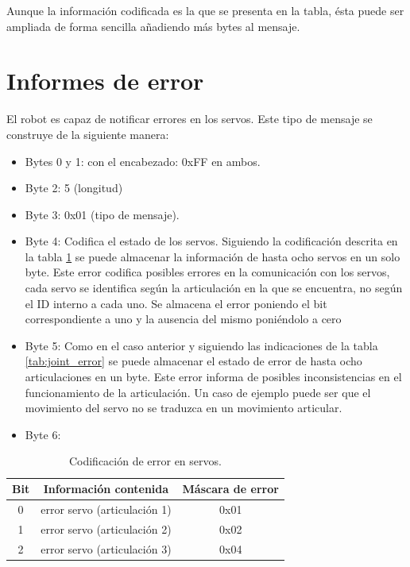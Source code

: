Aunque la información codificada es la que se presenta en la tabla, ésta puede ser ampliada de forma sencilla añadiendo más bytes al mensaje.


\section{Informes de error}


El robot es capaz de notificar errores en los servos. Este tipo de mensaje se construye de la siguiente manera:

\begin{itemize}

\item Bytes 0 y 1: con el encabezado: 0xFF en ambos.

\item Byte 2: 5 (longitud)

\item Byte 3: 0x01 (tipo de mensaje).

\item Byte 4: Codifica el estado de los servos. Siguiendo la codificación descrita en la tabla \ref{tab:servo_error} se puede almacenar la información de hasta ocho servos en un solo byte. Este error codifica posibles errores en la comunicación con los servos, cada servo se identifica según la articulación en la que se encuentra, no según el ID interno a cada uno. Se almacena el error poniendo el bit correspondiente a uno y la ausencia del mismo poniéndolo a cero

\item Byte 5: Como en el caso anterior y siguiendo las indicaciones de la tabla \ref{tab:joint_error} se puede almacenar el estado de error de hasta ocho articulaciones en un byte. Este error informa de posibles inconsistencias en el funcionamiento de la articulación. Un caso de ejemplo puede ser que el movimiento del servo no se traduzca en un movimiento articular.

\item Byte 6: 

\end{itemize}


\begin{table}[htbp]
\centering
\caption{Codificación de error en servos.}
\label{tab:servo_error}
\begin{center}
\begin{tabular}{|c|c|c|}
\hline
\textbf{Bit} & \textbf{Información contenida} & \textbf{Máscara de error} \\
\hline
0 & error servo (articulación 1) & 0x01 \\
\hline
1 & error servo (articulación 2) & 0x02 \\
\hline
2 & error servo (articulación 3) & 0x04 \\
\hline
\end{tabular}
\end{center}
\end{table}

